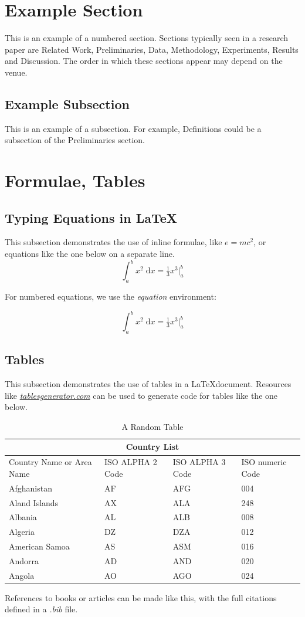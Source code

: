 \documentclass[a4paper]{article}
\begin{document}
\section{Example Section}
This is an example of a numbered section. Sections typically seen in a research paper are Related Work, Preliminaries, Data, Methodology, Experiments, Results and Discussion. The order in which these sections appear may depend on the venue.

\subsection{Example Subsection}
This is an example of a subsection. For example, Definitions could be a subsection of the Preliminaries section.

\section{Formulae, Tables}
\subsection{Typing Equations in \LaTeX}
This subsection demonstrates the use of inline formulae, like $e=mc^2$, or equations like the one below on a separate line. \[\int_a^b x^2\;\mathrm{d}x= \tfrac{1}{3} x^3 \Big|_a^b\]

For numbered equations, we use the \textit{equation} environment:

\begin{equation}
    \int_a^b x^2\;\mathrm{d}x= \tfrac{1}{3} x^3 \Big|_a^b
\end{equation}

\subsection{Tables}
This subsection demonstrates the use of tables in a \LaTeX document. Resources like \href{https://www.tablesgenerator.com/}{\emph{tablesgenerator.com}} can be used to generate code for tables like the one below.\

\begin{table}[h]
    \centering
    \begin{tabular}{ |p{3cm}||p{3cm}|p{3cm}|p{3cm}|  }
     \hline
     \multicolumn{4}{|c|}{Country List} \\
     \hline
     Country Name     or Area Name& ISO ALPHA 2 Code &ISO ALPHA 3 Code&ISO numeric Code\\
     \hline
     Afghanistan   & AF    &AFG&   004\\
     Aland Islands&   AX  & ALA   &248\\
     Albania &AL & ALB&  008\\
     Algeria    &DZ & DZA&  012\\
     American Samoa&   AS  & ASM&016\\
     Andorra& AD  & AND   &020\\
     Angola& AO  & AGO&024\\
     \hline
    \end{tabular}
    \caption{A Random Table}
    \label{tab:my_label}
\end{table}

References to books \cite{DUMMY:1} or articles \cite{ARTICLE:1} can be made like this, with the full citations defined in a \emph{.bib} file.



\end{document}
